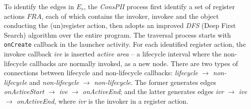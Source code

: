
To identify the edges in $E_r$, the \textit{ConsPII} process first identify a set of register actions $\mathit{FRA}$, each of which contains the invoker, invokee and the object conducting the (un)register action, then adopts an improved \textit{DFS} (Deep First Search) algorithm over the entire program. The traversal process starts with \texttt{onCreate} callback in the launcher activity. For each identified register action, the invokee callback \textit{ive} is inserted \textit{active area} -- a lifecycle interval where the non-lifecycle callbacks are normally invoked, as a new node. 
There are two types of connections between lifecycle and non-lifecycle callbacks: \textit{lifecycle} $\rightarrow $ \textit{non-lifecycle} and \textit{non-lifecycle} $\rightarrow $ \textit{non-lifecycle}. The former generates edges \textit{onActiveStart} $\rightarrow $ \textit{ive} $\rightarrow $ \textit{onActiveEnd}; and the latter generates edges \textit{ivr} $\rightarrow $ \textit{ive} $\rightarrow $ \textit{onActiveEnd}, where \textit{ivr} is the invoker in a register action. %


